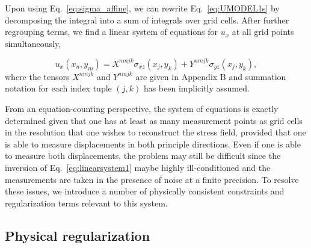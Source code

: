 \documentclass[aps,prl,reprint,twocolumn,groupedaddress,showpacs]{revtex4}
\begin{document}
Upon using Eq.~\ref{eq:sigma_affine}, we can rewrite
Eq.~\ref{eq:UMODEL1s} by decomposing the integral into a sum of
integrals over grid cells.  After further regrouping terms, we find a
linear system of equations for $u_x$ at all grid points
simultaneously,

\begin{equation}
u_{x}(x_{n},y_{m}) = X^{nmjk}\sigma_{xz}(x_j,y_k) + Y^{nmjk}\sigma_{yz}(x_j,y_k),
\label{eq:linearsystem1}
\end{equation}
%
where the tensors $X^{nmjk}$ and $Y^{nmjk}$ are given in Appendix B and 
summation notation for each index tuple $(j,k)$ has been implicitly assumed.

From an equation-counting perspective, the system of equations is
exactly determined given that one has at least as many measurement
points as grid cells in the resolution that one wishes to reconstruct
the stress field, provided that one is able to measure displacements
in both principle directions. Even if one is able to measure both
displacements, the problem may still be difficult since the inversion
of Eq.~\ref{eq:linearsystem1} maybe highly ill-conditioned and the
measurements are taken in the presence of noise at a finite
precision. To resolve these issues, we introduce a number of
physically consistent constraints and regularization terms relevant to
this system.

\subsection{Physical regularization}
\end{document}
